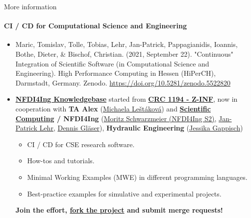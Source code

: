 
\begin{frame}{More information}
    \framesubtitle{CI / CD for Computational Science and Engineering} 

    \begin{itemize}
        \item Maric, Tomislav, Tolle, Tobias, Lehr, Jan-Patrick, Pappagianidis, Ioannis, Bothe, Dieter, \& Bischof, Christian. (2021, September 22). "Continuous" Integration of Scientific Software (in Computational Science and Engineering). High Performance Computing in Hessen (HiPerCH), Darmstadt, Germany. Zenodo. \href{https://doi.org/10.5281/zenodo.5522820}{https://doi.org/10.5281/zenodo.5522820}
        \item \href{https://nfdi4ing.pages.rwth-aachen.de/knowledge-base}{\textbf{NFDI4Ing Knowledgebase}} started from \href{https://www.sfb1194.tu-darmstadt.de/index.en.jsp}{\textbf{CRC 1194 - Z-INF}}, now in cooperation with \textbf{TA Alex} (\href{https://www.fst.tu-darmstadt.de/fachgebiet/mitarbeiter/mitarbeiterdetails_fst_190208.de.jsp}{Michaela Leštáková}) and \textbf{\href{https://www.informatik.tu-darmstadt.de/sc/fg/index.en.jsp}{Scientific Computing} / NFDI4Ing} (\href{https://www.informatik.tu-darmstadt.de/sc/fg/people/details/moritz_schwarzmeier.en.jsp}{Moritz Schwarzmeier (NFDI4Ing S2)}, \href{https://www.informatik.tu-darmstadt.de/sc/fg/people/details/jan_patrick_lehr.en.jsp}{Jan-Patrick Lehr}, \href{https://www.iws.uni-stuttgart.de/en/institute/team/Glaeser-00002/}{Dennis Gläser}), \textbf{Hydraulic Engineering} (\href{https://www.wasserbau.tu-darmstadt.de/wasserbau/fachgebiet_wabau/team_wabau/Details_108736.de.jsp}{Jessika Gappisch})

        \begin{itemize}
            \item CI / CD for CSE research software. 
            \item How-tos and tutorials.  
            \item Minimal Working Examples (MWE) in different programming languages.
            \item Best-practice examples for simulative and experimental projects.
        \end{itemize}

        \textbf{Join the effort, \href{https://git.rwth-aachen.de/nfdi4ing/knowledge-base}{fork the project} and submit merge requests!}\\
    \end{itemize}

\end{frame}
